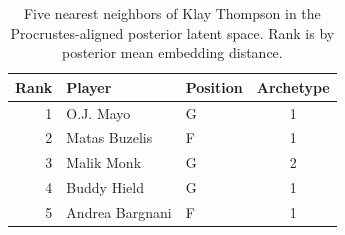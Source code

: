 \begin{table}[htbp]
  \centering\small
  \begin{tabular}{rllc}
    \toprule
    Rank & Player & Position & Archetype \\
    \midrule
    1 & O.J. Mayo & G & 1 \\
    2 & Matas Buzelis & F & 1 \\
    3 & Malik Monk & G & 2 \\
    4 & Buddy Hield & G & 1 \\
    5 & Andrea Bargnani & F & 1 \\
    \bottomrule
  \end{tabular}
  \caption{Five nearest neighbors of Klay Thompson in the Procrustes-aligned posterior latent space. Rank is by posterior mean embedding distance.}
  \label{tab:Klay_Thompson_neighbors}
\end{table}

